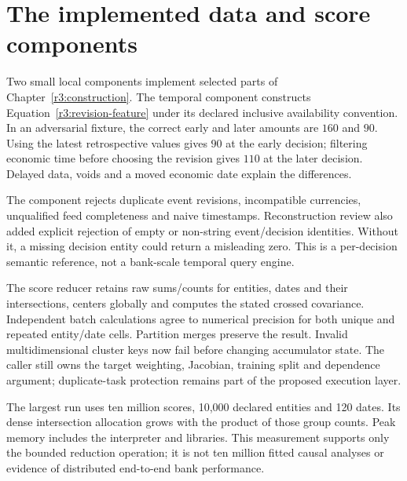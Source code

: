 

\section{The implemented data and score components}
\label{r3:component-evidence}

Two small local components implement selected parts of
Chapter~\ref{r3:construction}. The temporal component constructs
Equation~\eqref{r3:revision-feature} under its declared inclusive
availability convention. In an adversarial fixture, the correct
early and later amounts are $160$ and $90$. Using the latest
retrospective values gives $90$ at the early decision; filtering
economic time before choosing the revision gives $110$ at the later
decision. Delayed data, voids and a moved economic date explain the
differences.

The component rejects duplicate event revisions, incompatible currencies,
unqualified feed completeness and naive timestamps. Reconstruction review
also added explicit rejection of empty or non-string event/decision
identities. Without it, a missing decision entity could return a
misleading zero. This is a per-decision semantic reference, not a
bank-scale temporal query engine.

The score reducer retains raw sums/counts for entities, dates and their
intersections, centers globally and computes the stated crossed
covariance. Independent batch calculations agree to numerical precision
for both unique and repeated entity/date cells. Partition merges preserve
the result. Invalid multidimensional cluster keys now fail before
changing accumulator state. The caller still owns the target weighting,
Jacobian, training split and dependence argument; duplicate-task
protection remains part of the proposed execution layer.

\begin{table}[htbp]\centering\small

\caption{Median of three fresh processes at each size on the recorded host.
The workload generates and reduces precomputed two-dimensional scores;
it excludes source I/O, history reconstruction and model fitting.}
\label{r3:scale-measurement}
\end{table}

The largest run uses ten million scores, 10,000 declared entities and
120 dates. Its dense intersection allocation grows with the product
of those group counts. Peak memory includes the interpreter and
libraries. This measurement supports only the bounded reduction
operation; it is not ten million fitted causal analyses or evidence
of distributed end-to-end bank performance.

